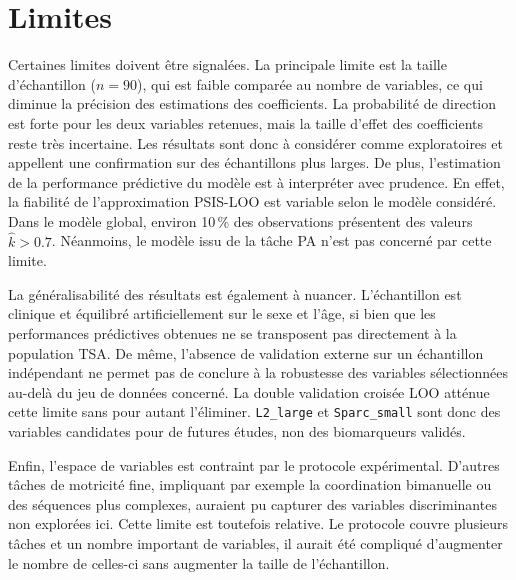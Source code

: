 \section{Limites}

Certaines limites doivent être signalées. La principale limite est la taille d'échantillon ($n = 90$), qui est faible comparée au nombre de variables, ce qui diminue la précision des estimations des coefficients. %
La probabilité de direction est forte pour les deux variables retenues, mais la taille d'effet des coefficients reste très incertaine. Les résultats sont donc à considérer comme exploratoires et appellent une confirmation sur des échantillons plus larges. De plus, l'estimation de la performance prédictive du modèle est à interpréter avec prudence. En effet, la fiabilité de l'approximation PSIS-LOO est variable selon le modèle considéré. Dans le modèle global, environ 10\,\% des observations présentent des valeurs $\hat{k} > 0.7$. Néanmoins, le modèle issu de la tâche PA n'est pas concerné par cette limite.

\medskip 

La généralisabilité des résultats est également à nuancer. L'échantillon est clinique et équilibré artificiellement sur le sexe et l'âge, si bien que les performances prédictives obtenues ne se transposent pas directement à la population TSA. De même, l'absence de validation externe sur un échantillon indépendant ne permet pas de conclure à la robustesse des variables sélectionnées au-delà du jeu de données concerné. La double validation croisée LOO atténue cette limite sans pour autant l'éliminer. \texttt{L2\_large} et \texttt{Sparc\_small} sont donc des variables candidates pour de futures études, non des biomarqueurs validés.

\medskip 

Enfin, l'espace de variables est contraint par le protocole expérimental. D'autres tâches de motricité fine, impliquant par exemple la coordination bimanuelle ou des séquences plus complexes, auraient pu capturer des variables discriminantes non explorées ici. Cette limite est toutefois relative. Le protocole couvre plusieurs tâches et un nombre important de variables, il aurait été compliqué d'augmenter le nombre de celles-ci sans augmenter la taille de l'échantillon.

